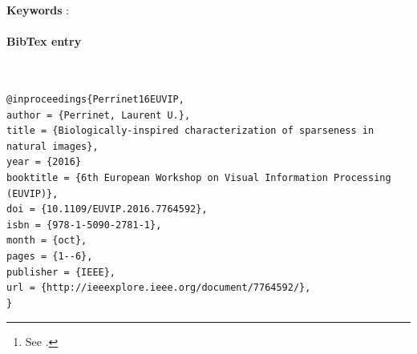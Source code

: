 \documentclass[a4paper, 10pt, twocolumns]{article}
\title{\Title}
\author{%
\FirstName\ \Author\thanks{See {\Website}.}\\
\Institute\ \\ \Address\ \\
\texttt{\Email} \\
}
\begin{document}
\if{}
\doublespacing
\fi

%
\maketitle
%
\begin{abstract}
\Abstract
\end{abstract}
%
\textbf{Keywords} : \Keywords
\paragraph{BibTex entry}~~\\
\begin{verbatim}
@inproceedings{Perrinet16EUVIP,
author = {Perrinet, Laurent U.},
title = {Biologically-inspired characterization of sparseness in natural images},
year = {2016}
booktitle = {6th European Workshop on Visual Information Processing (EUVIP)},
doi = {10.1109/EUVIP.2016.7764592},
isbn = {978-1-5090-2781-1},
month = {oct},
pages = {1--6},
publisher = {IEEE},
url = {http://ieeexplore.ieee.org/document/7764592/},
}
\end{verbatim}
\end{document}
